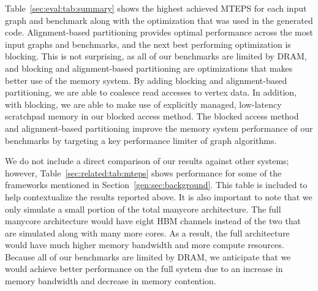 Table~\ref{sec:eval:tab:summary} shows the highest achieved MTEPS for each input graph and benchmark along with the optimization that was used in the generated code.
Alignment-based partitioning provides optimal performance across the most input graphs and benchmarks, and the next best performing optimization is blocking.
This is not surprising, as all of our benchmarks are limited by DRAM, and blocking and alignment-based partitioning are optimizations that makes better use of the memory system.
By adding blocking and alignment-based partitioning, we are able to coalesce read accesses to vertex data.
In addition, with blocking, we are able to make use of explicitly managed, low-latency scratchpad memory in our blocked access method. 
The blocked access method and alignment-based partitioning improve the memory system performance of our benchmarks by targeting a key performance limiter of graph algorithms.

\relatedMTEPSTable

We do not include a direct comparison of our results against other systems; however, Table~\ref{sec:related:tab:mteps} shows performance for some of the frameworks mentioned in Section~\ref{gen:sec:background}. This table is included to help contextualize the results reported above.
It is also important to note that we only simulate a small portion of the total manycore architecture. 
The full manycore architecture would have eight HBM channels instead of the two that are simulated along with many more cores.
As a result, the full architecture would have much higher memory bandwidth and more compute resources. 
Because all of our benchmarks are limited by DRAM, we anticipate that we would achieve better performance on the full system due to an increase in memory bandwidth and decrease in memory contention.

\overviewResultsTable